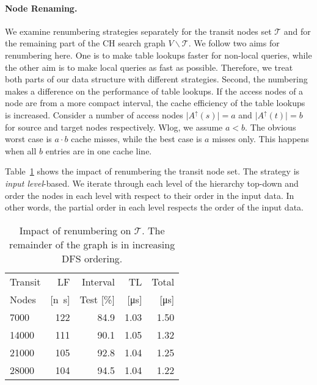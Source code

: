 \documentclass{llncs}
\begin{document}
\paragraph{Node Renaming.}
We examine renumbering strategies separately for the transit nodes set  $\mathcal{T}$ and for the remaining part of the CH search graph $V\backslash\mathcal{T}$.
We follow two aims for renumbering here.
One is to make table lookups faster for non-local queries, while the other aim is to make local queries as fast as possible.
Therefore, we treat both parts of our data structure with different strategies.
Second, the numbering makes a difference on the performance of table lookups. 
If the access nodes of a node are from a more compact interval, the cache efficiency of the table lookups is increased. 
Consider a number of access nodes $\vert A^\uparrow(s)\vert=a$ and $\vert A^\uparrow(t)\vert=b$ for source and target nodes respectively.
Wlog, we assume $a<b$.
The obvious worst case is $a \cdot b$ cache misses, while the best case is $a$ misses only.
This happens when all $b$ entries are in one cache line. 

Table~\ref{tab:RenamingTransit} shows the impact of renumbering the transit node set. 
The strategy is \emph{input level}-based.
We iterate through each level of the hierarchy top-down and order the nodes in each level with respect to their order in the  input data.
In other words, the partial order in each level respects the order of the input data.

\begin{table}[b]
\caption{Impact of renumbering on $\mathcal{T}$. The remainder of the graph is in increasing DFS ordering.}
\label{tab:RenamingTransit}
\centering
\begin{tabular}{lrrrr}
\toprule
Transit & LF & Interval & TL & Total \\
Nodes & [\si{n\second}] & Test [\%] & [\si{\micro\second}] & [\si{\micro\second}] \\
\midrule
7000 	& 122 & 84.9 & 1.03 & 1.50 \\
14000 & 111 & 90.1 & 1.05 & 1.32 \\
21000 & 105 & 92.8 & 1.04 & 1.25 \\
28000 & 104 & 94.5 & 1.04 & 1.22 \\
\bottomrule 
\end{tabular}
\end{table}
\end{document}
